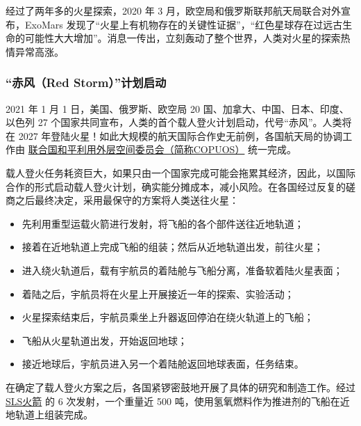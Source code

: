 \documentclass[letterpaper,10pt]{sphinxmanual}
\begin{document}
经过了两年多的火星探索，2020 年 3 月，欧空局和俄罗斯联邦航天局联合对外宣布，ExoMars 发现了“火星上有机物存在的关键性证据”，“红色星球存在过远古生命的可能性大大增加”。消息一传出，立刻轰动了整个世界，人类对火星的探索热情异常高涨。


\subsubsection{“赤风（Red Storm）”计划启动}
\label{history:red-storm}\label{history:index-1}
2021 年 1 月 1 日，美国、俄罗斯、欧空局 20 国、加拿大、中国、日本、印度、以色列 27 个国家共同宣布，人类的首个载人登火计划启动，代号“赤风”。人类将在 2027 年登陆火星！如此大规模的航天国际合作史无前例，各国航天局的协调工作由 \href{http://en.wikipedia.org/wiki/United\_Nations\_Committee\_on\_the\_Peaceful\_Uses\_of\_Outer\_Space}{联合国和平利用外层空间委员会（简称COPUOS）} 统一完成。

载人登火任务耗资巨大，如果只由一个国家完成可能会拖累其经济，因此，以国际合作的形式启动载人登火计划，确实能分摊成本，减小风险。在各国经过反复的磋商之后最终决定，采用最保守的方案将人类送往火星：
\begin{itemize}
\item {} 
先利用重型运载火箭进行发射，将飞船的各个部件送往近地轨道；

\item {} 
接着在近地轨道上完成飞船的组装；然后从近地轨道出发，前往火星；

\item {} 
进入绕火轨道后，载有宇航员的着陆舱与飞船分离，准备软着陆火星表面；

\item {} 
着陆之后，宇航员将在火星上开展接近一年的探索、实验活动；

\item {} 
火星探索结束后，宇航员乘坐上升器返回停泊在绕火轨道上的飞船；

\item {} 
飞船从火星轨道出发，开始返回地球；

\item {} 
接近地球后，宇航员进入另一个着陆舱返回地球表面，任务结束。

\end{itemize}

在确定了载人登火方案之后，各国紧锣密鼓地开展了具体的研究和制造工作。经过 \href{http://en.wikipedia.org/wiki/Space\_Launch\_System}{SLS火箭} 的 6 次发射，一个重量近 500 吨，使用氢氧燃料作为推进剂的飞船在近地轨道上组装完成。
\end{document}
